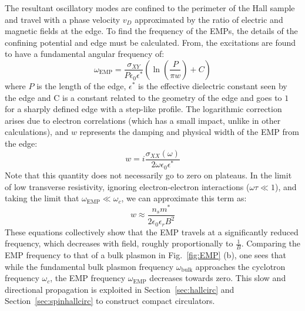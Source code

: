 The resultant oscillatory modes are confined to the perimeter of the Hall sample and travel with a phase velocity $v_D$ approximated by the ratio
of electric and magnetic fields at the edge. To find the frequency of the EMPs, the details of the confining potential and edge must be calculated.
From\cite{1988ZhETF..94..217V}, the excitations are found to have a fundamental angular frequency of:
\begin{equation}
  \omega_{\textrm{EMP}} = \frac{\sigma_{XY}}{P\epsilon_0\epsilon^*}\left(\ln\left(\frac{P}{\pi w}\right) + C\right)
\end{equation}
where $P$ is the length of the edge, $\epsilon^*$ is the effective dielectric constant seen by the edge and C is a constant related to the geometry of the edge and goes to $1$ for a sharply defined edge with a step-like profile. The logarithmic correction arises due to electron correlations (which has a small impact,
unlike in other calculations), and $w$ represents the damping and physical width of the EMP from the edge:
\begin{equation}
  w = i\frac{\sigma_{XX}(\omega)}{2\omega\epsilon_0\epsilon^*}
\end{equation}
Note that this quantity does not necessarily go to zero on plateaus.
In the limit of low transverse resistivity, ignoring electron-electron interactions ($\omega\tau \ll 1$), and taking the limit
that $\omega_{\textrm{EMP}} \ll \omega_c$, we can approximate this term as:
\begin{equation}
  w \approx \frac{n_sm^*}{2\epsilon_0\epsilon_r B^2}
\end{equation}
These equations collectively show that the EMP travels at a significantly reduced frequency, which decreases with field, roughly proportionally to $\tfrac{1}{B}$.
Comparing the EMP frequency to that of a bulk plasmon in Fig.~\ref{fig:EMP} (b), one sees that while the fundamental bulk plasmon frequency $\omega_\textrm{bulk}$
approaches the cyclotron frequency $\omega_c$, the EMP frequency $\omega_\textrm{EMP}$ decreases towards zero. This slow and directional propagation is exploited in
Section~\ref{sec:hallcirc} and Section~\ref{sec:spinhallcirc} to construct compact circulators.

